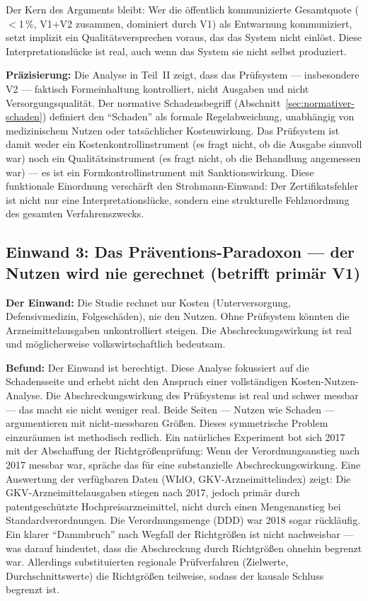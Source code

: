 \documentclass{umbruch-position}
\begin{document}
Der Kern des Arguments bleibt: Wer die öffentlich kommunizierte Gesamtquote ($<$1\,\%, V1+V2 zusammen, dominiert durch V1) als Entwarnung kommuniziert, setzt implizit ein Qualitätsversprechen voraus, das das System nicht einlöst. Diese Interpretationslücke ist real, auch wenn das System sie nicht selbst produziert.

\textbf{Präzisierung:} Die Analyse in Teil~II zeigt, dass das Prüfsystem --- insbesondere V2 --- faktisch Formeinhaltung kontrolliert, nicht Ausgaben und nicht Versorgungsqualität. Der normative Schadensbegriff (Abschnitt~\ref{sec:normativer-schaden}) definiert den ``Schaden'' als formale Regelabweichung, unabhängig von medizinischem Nutzen oder tatsächlicher Kostenwirkung. Das Prüfsystem ist damit weder ein Kostenkontrollinstrument (es fragt nicht, ob die Ausgabe sinnvoll war) noch ein Qualitätsinstrument (es fragt nicht, ob die Behandlung angemessen war) --- es ist ein Formkontrollinstrument mit Sanktionswirkung. Diese funktionale Einordnung verschärft den Strohmann-Einwand: Der Zertifikatsfehler ist nicht nur eine Interpretationslücke, sondern eine strukturelle Fehlzuordnung des gesamten Verfahrenszwecks.

\subsection{Einwand 3: Das Präventions-Paradoxon --- der Nutzen wird nie gerechnet (betrifft primär V1)}

\textbf{Der Einwand:} Die Studie rechnet nur Kosten (Unterversorgung, Defensivmedizin, Folgeschäden), nie den Nutzen. Ohne Prüfsystem könnten die Arzneimittelausgaben unkontrolliert steigen. Die Abschreckungswirkung ist real und möglicherweise volkswirtschaftlich bedeutsam.

\textbf{Befund:} Der Einwand ist berechtigt. Diese Analyse fokussiert auf die Schadensseite und erhebt nicht den Anspruch einer vollständigen Kosten-Nutzen-Analyse. Die Abschreckungswirkung des Prüfsystems ist real und schwer messbar --- das macht sie nicht weniger real. Beide Seiten --- Nutzen wie Schaden --- argumentieren mit nicht-messbaren Größen. Dieses symmetrische Problem einzuräumen ist methodisch redlich. Ein natürliches Experiment bot sich 2017 mit der Abschaffung der Richtgrößenprüfung: Wenn der Verordnungsanstieg nach 2017 messbar war, spräche das für eine substanzielle Abschreckungswirkung. Eine Auswertung der verfügbaren Daten (WIdO, GKV-Arzneimittelindex) zeigt: Die GKV-Arzneimittelausgaben stiegen nach 2017, jedoch primär durch patent\-geschützte Hochpreisarzneimittel, nicht durch einen Mengenanstieg bei Standardverordnungen. Die Verordnungsmenge (DDD) war 2018 sogar rückläufig. Ein klarer ``Dammbruch'' nach Wegfall der Richtgrößen ist nicht nachweisbar --- was darauf hindeutet, dass die Abschreckung durch Richtgrößen ohnehin begrenzt war. Allerdings substituierten regionale Prüfverfahren (Zielwerte, Durchschnittswerte) die Richtgrößen teilweise, sodass der kausale Schluss begrenzt ist.
\end{document}
